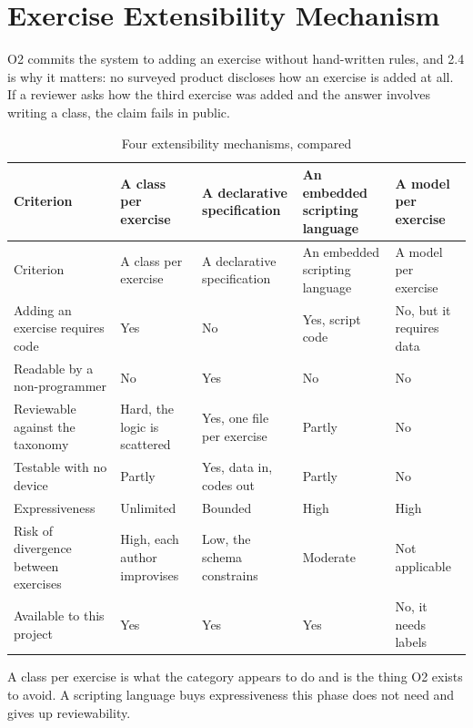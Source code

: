 \section{Exercise Extensibility Mechanism}
\label{sec:4.6}

O2 commits the system to adding an exercise without hand-written rules, and 2.4 is why it matters: no surveyed product discloses how an exercise is added at all. If a reviewer asks how the third exercise was added and the answer involves writing a class, the claim fails in public.

{\footnotesize
\setlength{\LTpre}{6pt}\setlength{\LTpost}{8pt}
\begin{longtable}{>{\raggedright\arraybackslash}p{}>{\raggedright\arraybackslash}p{}>{\raggedright\arraybackslash}p{}>{\raggedright\arraybackslash}p{}>{\raggedright\arraybackslash}p{}}
\caption{Four extensibility mechanisms, compared}\\
\toprule
Criterion & A class per exercise & A declarative specification & An embedded scripting language & A model per exercise \\
\midrule
\endfirsthead
\toprule
Criterion & A class per exercise & A declarative specification & An embedded scripting language & A model per exercise \\
\midrule
\endhead
\bottomrule
\endfoot
\bottomrule
\endlastfoot
Adding an exercise requires code & Yes & No & Yes, script code & No, but it requires data \\
Readable by a non-programmer & No & Yes & No & No \\
Reviewable against the taxonomy & Hard, the logic is scattered & Yes, one file per exercise & Partly & No \\
Testable with no device & Partly & Yes, data in, codes out & Partly & No \\
Expressiveness & Unlimited & Bounded & High & High \\
Risk of divergence between exercises & High, each author improvises & Low, the schema constrains & Moderate & Not applicable \\
Available to this project & Yes & Yes & Yes & No, it needs labels \\
\end{longtable}
}

A class per exercise is what the category appears to do and is the thing O2 exists to avoid. A scripting language buys expressiveness this phase does not need and gives up reviewability.

